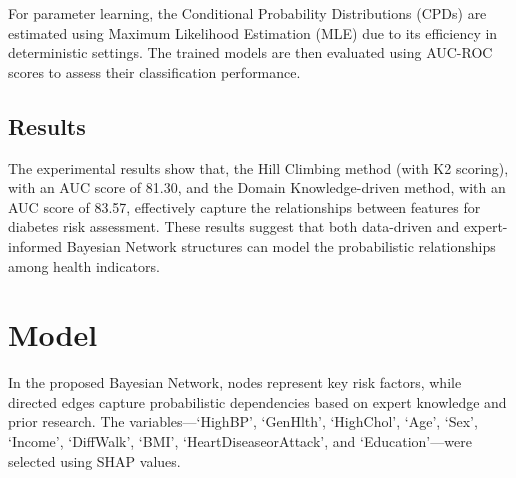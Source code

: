 \documentclass[letterpaper]{article}
\begin{document}



For parameter learning, the Conditional Probability Distributions (CPDs) are estimated using Maximum Likelihood Estimation (MLE) due to its efficiency in deterministic settings. The trained models are then evaluated using AUC-ROC scores to assess their classification performance.  


\subsection{Results}

The experimental results show that, the Hill Climbing method (with K2 scoring), with an AUC score of 81.30, and the Domain Knowledge-driven method, with an AUC score of 83.57, effectively capture the relationships between features for diabetes risk assessment. These results suggest that both data-driven and expert-informed Bayesian Network structures can model the probabilistic relationships among health indicators.

\section{Model}

In the proposed Bayesian Network, nodes represent key risk factors, while directed edges capture probabilistic dependencies based on expert knowledge and prior research. The variables—‘HighBP’, ‘GenHlth’, ‘HighChol’, ‘Age’, ‘Sex’, ‘Income’, ‘DiffWalk’, ‘BMI’, ‘HeartDiseaseorAttack’, and ‘Education’—were selected using SHAP values.
\end{document}
